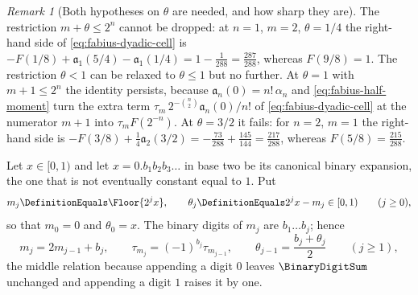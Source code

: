 \documentclass[11pt,a4paper,oneside,openany]{book}
\theoremstyle{definition}
\theoremstyle{remark}
\newtheorem{remark}[remark]{Remark}
\begin{document}
\begin{remark}[Both hypotheses on $\theta$ are needed, and how sharp they are]\label{rem:fabius-cell-sharpness}
The restriction $m+\theta\le2^n$ cannot be dropped: at $n=1$, $m=2$, $\theta=1/4$ the
right-hand side of \eqref{eq:fabius-dyadic-cell} is
$-F(1/8)+\mathfrak a_1(5/4)-\mathfrak a_1(1/4)=1-\frac1{288}=\frac{287}{288}$, whereas
$F(9/8)=1$.  The restriction $\theta<1$ can be relaxed to $\theta\le1$ but no further.
At $\theta=1$ with $m+1\le2^n$ the identity persists, because
$\mathfrak a_n(0)=n!\,\alpha_n$ and \eqref{eq:fabius-half-moment} turn the extra term
$\tau_m\,2^{-\binom n2}\mathfrak a_n(0)/n!$ of \eqref{eq:fabius-dyadic-cell} at the
numerator $m+1$ into $\tau_mF(2^{-n})$.  At $\theta=3/2$ it fails: for $n=2$, $m=1$ the
right-hand side is
$-F(3/8)+\frac14\mathfrak a_2(3/2)=-\frac{73}{288}+\frac{145}{144}=\frac{217}{288}$,
whereas $F(5/8)=\frac{215}{288}$.
\end{remark}



Let $x\in[0,1)$ and let $x=0.b_1b_2b_3\ldots$ in base two be its canonical binary
expansion, the one that is not eventually constant equal to $1$.  Put
\begin{equation}\label{eq:fabius-digit-prefix}
 m_j\DefinitionEquals\Floor{2^jx},
 \qquad
 \theta_j\DefinitionEquals2^jx-m_j\in[0,1)
 \qquad(j\ge0),
\end{equation}
so that $m_0=0$ and $\theta_0=x$.  The binary digits of $m_j$ are $b_1\ldots b_j$;
hence
\begin{equation}\label{eq:fabius-digit-recursions}
 m_j=2m_{j-1}+b_j,
 \qquad
 \tau_{m_j}=(-1)^{b_j}\tau_{m_{j-1}},
 \qquad
 \theta_{j-1}=\frac{b_j+\theta_j}2
 \qquad(j\ge1),
\end{equation}
the middle relation because appending a digit $0$ leaves $\BinaryDigitSum$ unchanged and appending
a digit $1$ raises it by one.
\end{document}
